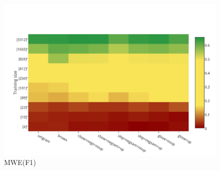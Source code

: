 \documentclass{beamer}
\newcommand{\task}[1]{\textsf{#1}\xspace}
\newcommand{\ner}{\task{NER}}
\newcommand{\mwe}{\task{MWE}}
\newcommand{\evmeasure}[1]{\textsc{#1}\xspace}
\newcommand{\fscore}{\evmeasure{F1}}
\begin{document}
\begin{frame}[plain]
\begin{columns}
\begin{figure}
	\caption{\ner (\fscore)}	
	\vspace{-0.3cm}
    \includegraphics[scale=0.22]{../plots/map-mwe-color-invert}
	\caption{\mwe (\fscore)}	
     \end{figure}
\end{columns}
\end{frame}
\end{document}
